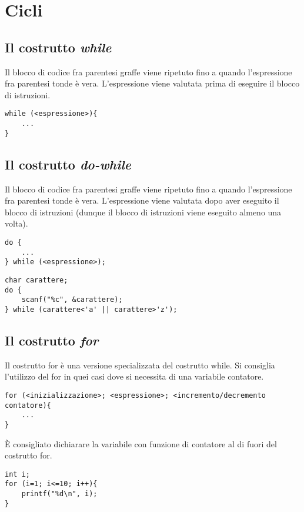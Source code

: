 \section{Cicli}
\subsection{Il costrutto \textit{while}}
Il blocco di codice fra parentesi graffe viene ripetuto fino a quando l'espressione fra parentesi tonde è vera. L'espressione viene valutata prima di eseguire il blocco di istruzioni.
\begin{lstlisting}[title={Struttura del costrutto while}]
while (<espressione>){
    ...
}
\end{lstlisting}

\subsection{Il costrutto \textit{do-while}}
Il blocco di codice fra parentesi graffe viene ripetuto fino a quando l'espressione fra parentesi tonde è vera. L'espressione viene valutata dopo aver eseguito il blocco di istruzioni (dunque il blocco di istruzioni viene eseguito almeno una volta).
\begin{lstlisting}[title={Struttura del costrutto do-while}]
do {
    ...
} while (<espressione>);
\end{lstlisting}
\begin{lstlisting}[title={Lettura carattere da tastiera}]
char carattere;
do {
    scanf("%c", &carattere);
} while (carattere<'a' || carattere>'z');
\end{lstlisting}

\subsection{Il costrutto \textit{for}}
Il costrutto \colorbox{light-gray}{for} è una versione specializzata del costrutto while. Si consiglia l'utilizzo del for in quei casi dove si necessita di una variabile contatore.
\begin{lstlisting}[title={Struttura del costrutto for}]
for (<inizializzazione>; <espressione>; <incremento/decremento contatore){
    ...
}
\end{lstlisting}
\`{E} consigliato dichiarare la variabile con funzione di contatore al di fuori del costrutto \colorbox{light-gray}{for}.
\begin{lstlisting}[title={Stampa i numeri da 1 a 10}]
int i;
for (i=1; i<=10; i++){
    printf("%d\n", i);
}
\end{lstlisting}

